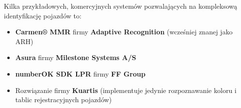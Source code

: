 Kilka przykładowych, komercyjnych systemów pozwalających na kompleksową identyfikację pojazdów to: 
\begin{itemize}
    \item \textbf{Carmen® MMR} firmy \textbf{Adaptive Recognition} (wcześniej znanej jako ARH) \cite{carmen}
    \item \textbf{Asura} firmy \textbf{Milestone Systems A/S} \cite{asura}
    \item \textbf{numberOK SDK LPR} firmy \textbf{FF Group} \cite{numberok}
    \item Rozwiązanie firmy \textbf{Kuartis} (implementuje jedynie rozpoznawanie koloru i tablic rejestracyjnych pojazdów) \cite{kuartis}
\end{itemize}
